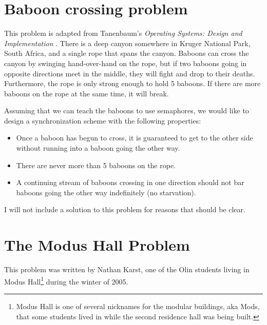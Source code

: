 \documentclass{book}
\begin{document}
\section{Baboon crossing problem}

This problem is adapted from Tanenbaum's {\em Operating Systems:
Design and Implementation} \cite{tanenbaum}.
There is a deep canyon somewhere in
Kruger National Park, South Africa, and a single rope that spans the
canyon.  Baboons can cross the canyon by swinging hand-over-hand on
the rope, but if two baboons going in opposite directions meet in the
middle, they will fight and drop to their deaths.  Furthermore,
the rope is only strong enough to hold 5 baboons.  If there are
more baboons on the rope at the same time, it will break.

Assuming that we can teach the baboons to use semaphores, we
would like to design a synchronization scheme with the following
properties:

\begin{itemize}

\item Once a baboon has begun to cross, it is guaranteed
to get to the other side without running into a baboon going
the other way.

\item There are never more than 5 baboons on the rope.

\item A continuing stream of baboons crossing in one direction
should not bar baboons going the other way indefinitely
(no starvation).

\end{itemize}

I will not include a solution to this problem for reasons that
should be clear.


\section{The Modus Hall Problem}

This problem was written by Nathan Karst, one of the Olin students
living in Modus Hall\footnote{Modus Hall is one of several nicknames
for the modular buildings, aka Mods, that some students lived in while
the second residence hall was being built.} during the winter of 2005.
\end{document}
